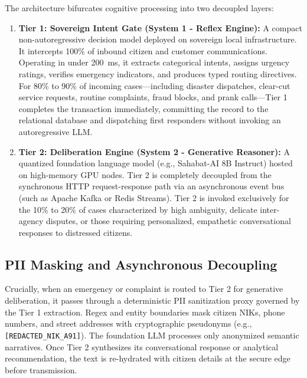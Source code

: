 \documentclass[journal,compsoc]{IEEEtran}
\begin{document}
The architecture bifurcates cognitive processing into two decoupled layers:
\begin{enumerate}
    \item \textbf{Tier 1: Sovereign Intent Gate (System 1 - Reflex Engine):}
    A compact non-autoregressive decision model deployed on sovereign local infrastructure. It intercepts 100\% of inbound citizen and customer communications. Operating in under 200~ms, it extracts categorical intents, assigns urgency ratings, verifies emergency indicators, and produces typed routing directives. For 80\% to 90\% of incoming cases—including disaster dispatches, clear-cut service requests, routine complaints, fraud blocks, and prank calls—Tier 1 completes the transaction immediately, committing the record to the relational database and dispatching first responders without invoking an autoregressive LLM.
    \item \textbf{Tier 2: Deliberation Engine (System 2 - Generative Reasoner):}
    A quantized foundation language model (e.g., Sahabat-AI 8B Instruct) hosted on high-memory GPU nodes. Tier 2 is completely decoupled from the synchronous HTTP request-response path via an asynchronous event bus (such as Apache Kafka or Redis Streams). Tier 2 is invoked exclusively for the 10\% to 20\% of cases characterized by high ambiguity, delicate inter-agency disputes, or those requiring personalized, empathetic conversational responses to distressed citizens.
\end{enumerate}

\subsection{PII Masking and Asynchronous Decoupling}
Crucially, when an emergency or complaint is routed to Tier 2 for generative deliberation, it passes through a deterministic PII sanitization proxy governed by the Tier 1 extraction. Regex and entity boundaries mask citizen NIKs, phone numbers, and street addresses with cryptographic pseudonyms (e.g., \texttt{[REDACTED\_NIK\_A91]}). The foundation LLM processes only anonymized semantic narratives. Once Tier 2 synthesizes its conversational response or analytical recommendation, the text is re-hydrated with citizen details at the secure edge before transmission.
\end{document}
